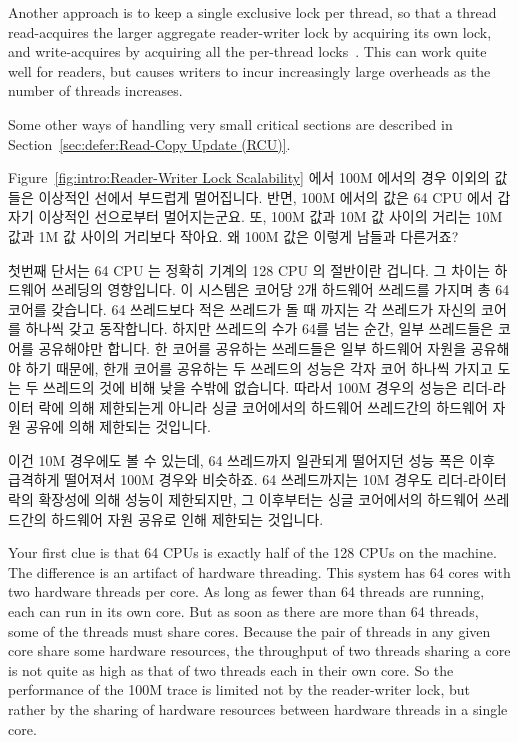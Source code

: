\begin{enumerate}
	Another approach is to keep a single exclusive lock per
	thread, so that a thread read-acquires the larger aggregate
	reader-writer lock by acquiring its own lock, and write-acquires
	by acquiring all the per-thread locks~\cite{WilsonCHsieh92a}.
	This can work quite well for readers, but causes writers
	to incur increasingly large overheads as the number of threads
	increases.

	Some other ways of handling very small critical sections are
	described in Section~\ref{sec:defer:Read-Copy Update (RCU)}.
	\fi

\QuickQ{}
	Figure~\ref{fig:intro:Reader-Writer Lock Scalability} 에서 100M 에서의
	경우 이외의 값들은 이상적인 선에서 부드럽게 멀어집니다.
	반면, 100M 에서의 값은 64 CPU 에서 갑자기 이상적인 선으로부터
	멀어지는군요.
	또, 100M 값과 10M 값 사이의 거리는 10M 값과 1M 값 사이의 거리보다
	작아요.
	왜 100M 값은 이렇게 남들과 다른거죠?

\QuickA{}
	첫번째 단서는 64 CPU 는 정확히 기계의 128 CPU 의 절반이란 겁니다.
	그 차이는 하드웨어 쓰레딩의 영향입니다.
	이 시스템은 코어당 2개 하드웨어 쓰레드를 가지며 총 64 코어를 갖습니다.
	64 쓰레드보다 적은 쓰레드가 돌 때 까지는 각 쓰레드가 자신의 코어를
	하나씩 갖고 동작합니다.
	하지만 쓰레드의 수가 64를 넘는 순간, 일부 쓰레드들은 코어를 공유해야만
	합니다.
	한 코어를 공유하는 쓰레드들은 일부 하드웨어 자원을 공유해야 하기
	때문에, 한개 코어를 공유하는 두 쓰레드의 성능은 각자 코어 하나씩 가지고
	도는 두 쓰레드의 것에 비해 낮을 수밖에 없습니다.
	따라서 100M 경우의 성능은 리더-라이터 락에 의해 제한되는게 아니라 싱글
	코어에서의 하드웨어 쓰레드간의 하드웨어 자원 공유에 의해 제한되는
	것입니다.

	이건 10M 경우에도 볼 수 있는데, 64 쓰레드까지 일관되게 떨어지던 성능
	폭은 이후 급격하게 떨어져서 100M 경우와 비슷하죠.
	64 쓰레드까지는 10M 경우도 리더-라이터 락의 확장성에 의해 성능이
	제한되지만, 그 이후부터는 싱글 코어에서의 하드웨어 쓰레드간의 하드웨어
	자원 공유로 인해 제한되는 것입니다.

	\iffalse
	Your first clue is that 64 CPUs is exactly half of the 128
	CPUs on the machine.
	The difference is an artifact of hardware threading.
	This system has 64 cores with two hardware threads per core.
	As long as fewer than 64 threads are running, each can run
	in its own core.
	But as soon as there are more than 64 threads, some of the threads
	must share cores.
	Because the pair of threads in any given core share some hardware
	resources, the throughput of two threads sharing a core is not
	quite as high as that of two threads each in their own core.
	So the performance of the 100M trace is limited not by the
	reader-writer lock, but rather by the sharing of hardware resources
	between hardware threads in a single core.


\end{enumerate}
